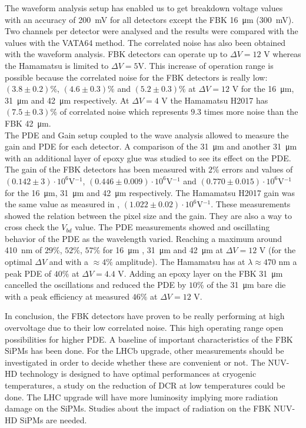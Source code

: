 The waveform analysis setup has enabled us to get breakdown voltage values with an accuracy of  \SI{200}{\milli \volt} for all detectors except the FBK \SI{16}{\micro m} (\SI{300}{\milli \volt}). Two channels per detector were analysed and the results were compared with the values with the VATA64 method.  
The correlated noise has also been obtained with the waveform analysis. FBK detectors can operate up to $\Delta V = 12$ V whereas the Hamamatsu is limited to $ \Delta V = 5$V. This increase of operation range is possible because the correlated noise for the FBK detectors is really low:  $(3.8 \pm 0.2)\%$, $(4.6\pm0.3)\%$ and $(5.2\pm0.3)\%$ at $\Delta V = 12$ V for the \SI{16}{\micro m}, \SI{31}{\micro m} and \SI{42}{\micro m} respectively. At $\Delta V = 4$ V the Hamamatsu H2017 has $(7.5\pm 0.3)\%$ of correlated noise which represents $9.3$ times more noise than the FBK \SI{42}{\micro m}. 
\\
The PDE and Gain setup coupled to the wave analysis allowed to measure the gain and PDE for each detector. A comparison of the \SI{31}{\micro m} and another \SI{31}{\micro m} with an additional layer of epoxy glue was studied to see its effect on the PDE. 
The gain of the FBK detectors has been measured with $2\%$ errors and values of $(0.142 \pm 3)\cdot10^{6} $V$^{-1}$, $(0.446\pm 0.009)\cdot10^{6} $V$^{-1}$ and $(0.770\pm 0.015)\cdot10^{6} 
$V$^{-1}$ for the \SI{16}{\micro m}, \SI{31}{\micro m} and \SI{42}{\micro m} respectively. The Hamamatsu H2017 gain was the same value as measured in \cite{Girard2018CharacterisationDistributions}, $(1.022\pm 0.02)\cdot10^{6}$V$^{-1}$. These measurements showed the relation between the pixel size and the gain. They are also a way to cross check the $V_{bd}$ value. 
The PDE measurements showed and oscillating behavior of the PDE as the wavelength varied. Reaching a maximum around \SI{410}{\nano m} of $29\%$, $52\%$, $57\%$ for \SI{16}{\micro m} , \SI{31}{\micro m} and \SI{42}{\micro m} at $\Delta V = 12$ V (for the optimal $\Delta V$ and with a $\approx 4\%$ amplitude). The Hamamatsu has at $\lambda \approx 470$ nm a peak PDE of $40\%$ at $\Delta V = 4.4$ V.
Adding an epoxy layer on the FBK \SI{31}{\micro m} cancelled the oscillations and reduced the PDE by $10\%$ of the \SI{31}{\micro m} bare die with a peak efficiency at measured $46\%$ at $\Delta V=12$ V.

In conclusion, the FBK detectors have proven to be really performing at high overvoltage due to their low correlated noise. This high operating range open possibilities for higher PDE. 
A baseline of important characteristics of the FBK SiPMs has been done. For the LHCb upgrade, other measurements should be investigated in order to decide whether these are convenient or not. The NUV-HD technology is designed to have optimal performances at cryogenic temperatures, a study on the reduction of DCR at low temperatures could be done. The LHC upgrade will have more luminosity implying more radiation damage on the SiPMs. Studies about the impact of radiation on the FBK NUV-HD SiPMs are needed. 
